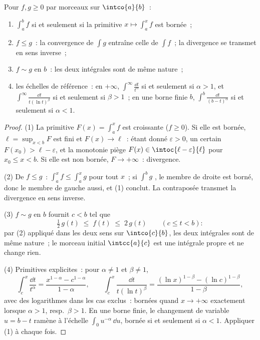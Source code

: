 \begin{theorem}\label{thm:b2:integration:comparison}
Pour $f, g \geq 0$  par morceaux sur $\intco{a}{b}$~:
\begin{enumerate}
  \item $\int_a^b f$  si et seulement si la primitive $x \mapsto \int_a^x
        f$ est bornée~;
  \item $f \leq g$~: la convergence de $\int g$ entraîne celle de $\int f$~;
        la divergence se transmet en sens inverse~;
  \item $f \sim g$ en $b$~: les deux intégrales sont de même nature~;
  \item les échelles de référence~: en $+\infty$, $\int^{\infty}
        \frac{\dd t}{t^\alpha}$  si et seulement si $\alpha > 1$, et
        $\int^\infty \frac{\dd t}{t(\ln t)^\beta}$ si et seulement si $\beta > 1$~;
        en une borne finie $b$, $\int^b \frac{\dd t}{(b -
        t)^\alpha}$  si et seulement si $\alpha < 1$.
\end{enumerate}
\end{theorem}

\begin{proof}
(1) La primitive $F(x) = \int_a^x f$ est croissante ($f \geq
0$). Si elle est bornée, $\ell = \sup_{x < b}F$ est fini et
$F(x) \to \ell$~: étant donné $\varepsilon > 0$, un certain $F(x_0) > \ell -
\varepsilon$, et la monotonie piège $F(x) \in
\intoc{\ell - \varepsilon}{\ell}$ pour $x_0 \leq x < b$. Si elle est
non bornée, $F \to +\infty$~: divergence.

(2) De $f \leq g$~: $\int_a^x f \leq \int_a^x g$ pour tout $x$~;
si $\int^b g$ , le membre de droite est borné, donc le
membre de gauche aussi, et (1) conclut. La contraposée transmet la
divergence en sens inverse.

(3) $f \sim g$ en $b$ fournit $c < b$ tel que
\[
\tfrac12\,g(t) \;\leq\; f(t) \;\leq\; 2\,g(t)
\qquad (c \leq t < b) :
\]
par (2) appliqué dans les deux sens sur $\intco{c}{b}$, les deux intégrales
sont de même nature~; le morceau initial $\intcc{a}{c}$ est une
intégrale propre et ne change rien.

(4) Primitives explicites~: pour $\alpha \neq 1$ et $\beta \neq 1$,
\[
\int_c^x \frac{\dd t}{t^\alpha}
= \frac{x^{1-\alpha} - c^{1-\alpha}}{1 - \alpha},
\qquad
\int_c^x \frac{\dd t}{t(\ln t)^\beta}
= \frac{(\ln x)^{1-\beta} - (\ln c)^{1-\beta}}{1 - \beta},
\]
avec des logarithmes dans les cas exclus~: bornées quand $x \to
+\infty$ exactement lorsque $\alpha > 1$, resp.\ $\beta > 1$. En une
borne finie, le changement de variable $u = b - t$ ramène à
l'échelle $\int_0 u^{-\alpha}\,\dd u$, bornée si et seulement si $\alpha < 1$.
Appliquer (1) à chaque fois.
\end{proof}

